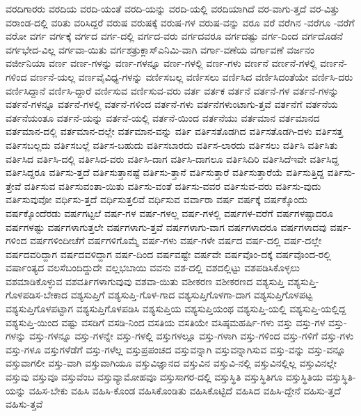 {ವರದಿಗಾರರು
ವರದಿಯ
ವರದಿ-ಯಂತೆ
ವರದಿ-ಯನ್ನು
ವರದಿ-ಯಲ್ಲಿ
ವರದಿಯಾಗಿದೆ
ವರ-ವಾಗು-ತ್ತದೆ
ವರ-ವಿತ್ತು
ವರಾಂಡ-ದಲ್ಲಿ
ವರಿತು
ವರಿಸಿದ್ದರೆ
ವರುಷ
ವರುಷಕ್ಕೆ
ವರುಷ-ಗಳ
ವರುಷ-ವನ್ನು
ವರೂ
ವರೆ
ವರೆಗಿನ
-ವರೆಗೂ
-ವರೆಗೆ
ವರೋ
ವರ್ಗ
ವರ್ಗಕ್ಕೆ
ವರ್ಗದ
ವರ್ಗ-ದಲ್ಲಿ
ವರ್ಗದ-ವರು
ವರ್ಗದವರೂ
ವರ್ಗದಷ್ಟು
ವರ್ಗ-ದಿಂದ
ವರ್ಗದೊಡನೆ
ವರ್ಗಭೇದ-ವಿಲ್ಲ
ವರ್ಗವಾ-ಯಿತು
ವರ್ಗಶತ್ರುಕ್ಲಾಸ್ಎನಿಮಿ-ವಾಗಿ
ವರ್ಗಾ-ವಣೆಯ
ವರ್ಗಾವಣೆ
ವರ್ಜನಂ
ವರ್ಜೀನಿಯಾ
ವರ್ಣ
ವರ್ಣ-ಗಳನ್ನು
ವರ್ಣ-ಗಳನ್ನೂ
ವರ್ಣ-ಗಳಲ್ಲಿ
ವರ್ಣ-ಗಳು
ವರ್ಣನೆ
ವರ್ಣನೆ-ಗಳಲ್ಲಿ
ವರ್ಣನೆ-ಗಳಿಂದ
ವರ್ಣನೆ-ಯಲ್ಲ
ವರ್ಣವೈವಿಧ್ಯ-ಗಳನ್ನು
ವರ್ಣಿಸಬಲ್ಲ
ವರ್ಣಿಸಲು
ವರ್ಣಿಸಿದ
ವರ್ಣಿಸಿದಂತೆಯೇ
ವರ್ಣಿಸಿ-ದರು
ವರ್ಣಿಸಿದ್ದಾನೆ
ವರ್ಣಿಸಿ-ದ್ದಾರೆ
ವರ್ಣಿಸುವ
ವರ್ಣಿಸುವ-ವರು
ವರ್ತ
ವರ್ತಕ
ವರ್ತನೆ
ವರ್ತನೆ-ಗಳ
ವರ್ತನೆ-ಗಳನ್ನು
ವರ್ತನೆ-ಗಳನ್ನೂ
ವರ್ತನೆ-ಗಳಲ್ಲಿ
ವರ್ತನೆ-ಗಳಿಂದ
ವರ್ತನೆ-ಗಳು
ವರ್ತನೆಗಳುಂಟಾಗು-ತ್ತವೆ
ವರ್ತನೆಗೆ
ವರ್ತನೆಯ
ವರ್ತನೆಯಂತೂ
ವರ್ತನೆ-ಯನ್ನು
ವರ್ತನೆ-ಯಲ್ಲಿ
ವರ್ತನೆ-ಯಿಂದ
ವರ್ತನೆಯು
ವರ್ತಮಾನ
ವರ್ತಮಾನದ
ವರ್ತಮಾನ-ದಲ್ಲಿ
ವರ್ತಮಾನ-ದಲ್ಲೇ
ವರ್ತಮಾನ-ವನ್ನು
ವರ್ತಿ
ವರ್ತಿಸತೊಡಗಿದ
ವರ್ತಿಸತೊಡಗಿ-ದಳು
ವರ್ತಿಸತ್ತ
ವರ್ತಿಸಬಲ್ಲದು
ವರ್ತಿಸಬಲ್ಲೆ
ವರ್ತಿಸ-ಬಹುದು
ವರ್ತಿಸಬಾರದು
ವರ್ತಿಸ-ಲಾರದು
ವರ್ತಿಸಲು
ವರ್ತಿಸಿ
ವರ್ತಿಸಿತು
ವರ್ತಿಸಿದ
ವರ್ತಿಸಿ-ದಲ್ಲಿ
ವರ್ತಿಸಿದ-ವರು
ವರ್ತಿಸಿ-ದಾಗ
ವರ್ತಿಸಿ-ದಾಗಲೂ
ವರ್ತಿಸಿದಿರಿ
ವರ್ತಿಸಿದೆಇವೇ
ವರ್ತಿಸಿದ್ದ
ವರ್ತಿಸಿದ್ದರೂ
ವರ್ತಿಸು-ತ್ತದೆ
ವರ್ತಿಸುತ್ತಾನಷ್ಟೆ
ವರ್ತಿಸು-ತ್ತಾನೆ
ವರ್ತಿಸುತ್ತಾರೆ
ವರ್ತಿಸುತ್ತಾರೆಯೆ
ವರ್ತಿಸುತ್ತಿದ್ದ
ವರ್ತಿಸು-ತ್ತೇವೆ
ವರ್ತಿಸುವ
ವರ್ತಿಸುವಂತಾ-ಯಿತು
ವರ್ತಿಸು-ವಂತೆ
ವರ್ತಿಸು-ವವರ
ವರ್ತಿಸುವ-ವರು
ವರ್ತಿಸು-ವುದು
ವರ್ತಿಸುವುವೋ
ವರ್ಧಿಸು-ತ್ತದೆ
ವರ್ಧಿಸುತ್ತಲಿವೆ
ವರ್ಧಿಸುವ
ವರ್ವಾರಾ
ವರ್ಷ
ವರ್ಷಕ್ಕೆ
ವರ್ಷಕ್ಕೊಂದು
ವರ್ಷಕ್ಕೊಂದೆರಡು
ವರ್ಷಗಟ್ಟಲೆ
ವರ್ಷ-ಗಳ
ವರ್ಷ-ಗಳಲ್ಲ
ವರ್ಷ-ಗಳಲ್ಲಿ
ವರ್ಷಗಳ-ವರೆಗೆ
ವರ್ಷಗಳಷ್ಟಾದರೂ
ವರ್ಷಗಳಷ್ಟು
ವರ್ಷಗಳಾಗುತ್ತಲೇ
ವರ್ಷಗಳಾಗು-ತ್ತವೆ
ವರ್ಷಗಳಾಗು-ವಾಗ
ವರ್ಷಗಳಾದರೂ
ವರ್ಷಗಳಾದವು
ವರ್ಷ-ಗಳಿಂದ
ವರ್ಷಗಳಿಂದೀಚೆಗೆ
ವರ್ಷಗಳಿಗೊಮ್ಮೆ
ವರ್ಷ-ಗಳು
ವರ್ಷ-ಗಳೇ
ವರ್ಷದ
ವರ್ಷ-ದಲ್ಲಿ
ವರ್ಷ-ದಲ್ಲೇ
ವರ್ಷದವರಿದ್ದಾಗ
ವರ್ಷದವಳಿದ್ದಾಗ
ವರ್ಷ-ದಿಂದ
ವರ್ಷವಷ್ಟೇ
ವರ್ಷವೇ
ವರ್ಷವೊಂ-ದಕ್ಕೆ
ವರ್ಷವೊಂದ-ರಲ್ಲಿ
ವರ್ಷಾಂತ್ಯದ
ವಲಸೆಬಂದಿದ್ದುದೇ
ವಲ್ಲಭಬಾಯಿ
ವವನು
ವಶ-ದಲ್ಲಿ
ವಶದಲ್ಲಿಟ್ಟು
ವಶಪಡಿಸಿಕೊಳ್ಳಲು
ವಶಮಾಡಿಕೊಳ್ಳುವ
ವಶವರ್ತಿಗಳಾಗುವುವು
ವಶವಾ-ಯಿತು
ವಶೀಕರಣ
ವಶೀಕರಣದ
ವಶ್ಯಸುಪ್ತಿ
ವಶ್ಯಸುಪ್ತಿ-ಗೊಳಪಡಿಸ-ಬೇಕಾದ
ವಶ್ಯಸುಪ್ತಿಗೆ
ವಶ್ಯಸುಪ್ತಿ-ಗೊಳ-ಗಾದ
ವಶ್ಯಸುಪ್ತಿಗೊಳಗಾ-ದಾಗ
ವಶ್ಯಸುಪ್ತಿಗೊಳಪಟ್ಟ
ವಶ್ಯಸುಪ್ತಿಗೊಳಪಟ್ಟಾಗ
ವಶ್ಯಸುಪ್ತಿಗೊಳಪಡಿಸಿ
ವಶ್ಯಸುಪ್ತಿಯ
ವಶ್ಯಸುಪ್ತಿಯಂಥ
ವಶ್ಯಸುಪ್ತಿ-ಯಲ್ಲಿ
ವಶ್ಯಸುಪ್ತಿ-ಯಲ್ಲಿದ್ದ
ವಶ್ಯಸುಪ್ತಿ-ಯಿಂದ
ವಷ್ಟು
ವಸಡಿಗೆ
ವಸಡಿ-ನಿಂದ
ವಸತಿಯ
ವಸತಿಯೇ
ವಸಿಷ್ಠಮಹರ್ಷಿ-ಗಳು
ವಸ್ತು
ವಸ್ತು-ಗಳ
ವಸ್ತು-ಗಳನ್ನು
ವಸ್ತು-ಗಳನ್ನೂ
ವಸ್ತು-ಗಳನ್ನೇ
ವಸ್ತು-ಗಳಲ್ಲಿ
ವಸ್ತುಗಳಲ್ಲೂ
ವಸ್ತು-ಗಳಾಗಿ
ವಸ್ತು-ಗಳಿಂದ
ವಸ್ತು-ಗಳಿಗೆ
ವಸ್ತು-ಗಳು
ವಸ್ತು-ಗಳೂ
ವಸ್ತುಗಳೆಡೆಗೆ
ವಸ್ತು-ಗಳೆಲ್ಲ
ವಸ್ತುಪ್ರಪಂಚದ
ವಸ್ತುವನ್ನಾಗಿ
ವಸ್ತುವನ್ನಾಗಿಸುವ
ವಸ್ತು-ವನ್ನು
ವಸ್ತು-ವನ್ನೂ
ವಸ್ತುವಾಗಲೀ
ವಸ್ತು-ವಾಗಿ
ವಸ್ತುವಾಗಿಯೂ
ವಸ್ತುವಿಜ್ಞಾನದ
ವಸ್ತುವಿನ
ವಸ್ತುವಿ-ನಲ್ಲಿ
ವಸ್ತುವಿನಲ್ಲಿಲ್ಲ
ವಸ್ತುವಿನಲ್ಲೇ
ವಸ್ತುವು
ವಸ್ತುವೂ
ವಸ್ತುವೆಂಬ
ವಸ್ತುವ್ಯಾಮೋಹವೂ
ವಸ್ತುಸಾಗರ-ದಲ್ಲಿ
ವಸ್ತುಸ್ಥಿತಿ
ವಸ್ತುಸ್ಥಿತಿಗೂ
ವಸ್ತುಸ್ಥಿತಿಯ
ವಸ್ತುಸ್ಥಿತಿ-ಯನ್ನು
ವಹಿಸ-ಬೇಕು
ವಹಿಸಿ
ವಹಿಸಿ-ಕೊಂಡ
ವಹಿಸಿಕೊಂಡಿತು
ವಹಿಸಿಕೊಟ್ಟಿದೆ
ವಹಿಸಿದ
ವಹಿಸಿ-ದ್ದೇನೆ
ವಹಿಸು-ತ್ತದೆ
ವಹಿಸು-ತ್ತವೆ
}
